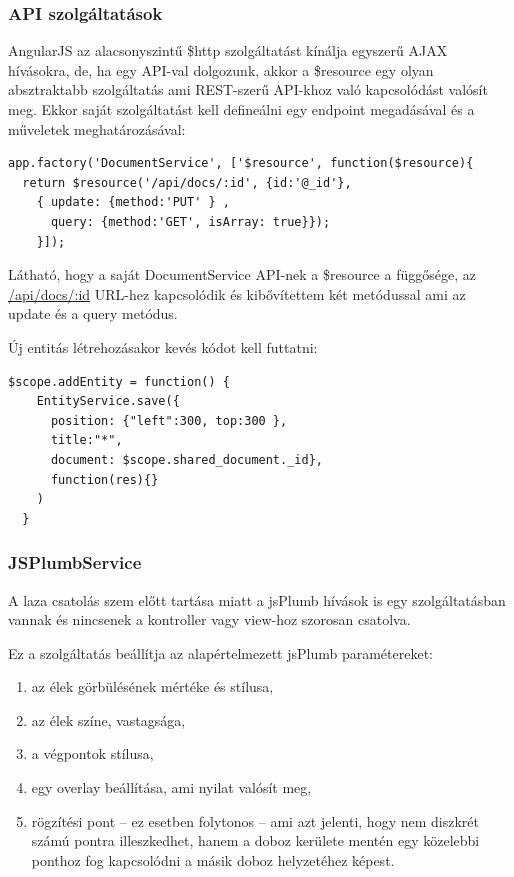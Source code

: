 \subsubsection{API szolgáltatások}

AngularJS az alacsonyszintű \$http szolgáltatást kínálja egyszerű AJAX hívásokra, de, ha egy API-val dolgozunk, akkor a \$resource egy olyan absztraktabb szolgáltatás ami REST-szerű API-khoz való kapcsolódást valósít meg. Ekkor saját szolgáltatást kell defineálni egy endpoint megadásával és a műveletek meghatározásával:


\begin{lstlisting}[caption=Szerveroldali erőforrás csomagolása AngularJS-vel]
  app.factory('DocumentService', ['$resource', function($resource){
  return $resource('/api/docs/:id', {id:'@_id'}, 
    { update: {method:'PUT' } , 
      query: {method:'GET', isArray: true}});
    }]);
\end{lstlisting}


Látható, hogy a saját DocumentService API-nek a \$resource a függősége, az \url{/api/docs/:id} URL-hez kapcsolódik és kibővítettem két metódussal ami az update és a query metódus. 

Új entitás létrehozásakor kevés kódot kell futtatni:
\begin{lstlisting}[caption=Új entitás létrehozása]
 $scope.addEntity = function() {
    EntityService.save({ 
      position: {"left":300, top:300 },
      title:"*", 
      document: $scope.shared_document._id}, 
      function(res){}
    )
  }
\end{lstlisting}

\subsubsection{JSPlumbService}


A laza csatolás szem előtt tartása miatt a jsPlumb hívások is egy szolgáltatásban vannak és nincsenek a kontroller vagy view-hoz szorosan csatolva. 

Ez a szolgáltatás beállítja az alapértelmezett jsPlumb paramétereket:

\begin{enumerate}
\item az élek görbülésének mértéke és stílusa,
\item az élek színe, vastagsága,
\item a végpontok stílusa,
\item egy overlay beállítása, ami nyilat valósít meg,
\item  rögzítési pont -- ez esetben folytonos -- ami azt jelenti, hogy nem diszkrét számú pontra illeszkedhet, hanem a doboz kerülete mentén egy közelebbi ponthoz fog kapcsolódni a másik doboz helyzetéhez képest.
\end{enumerate}

